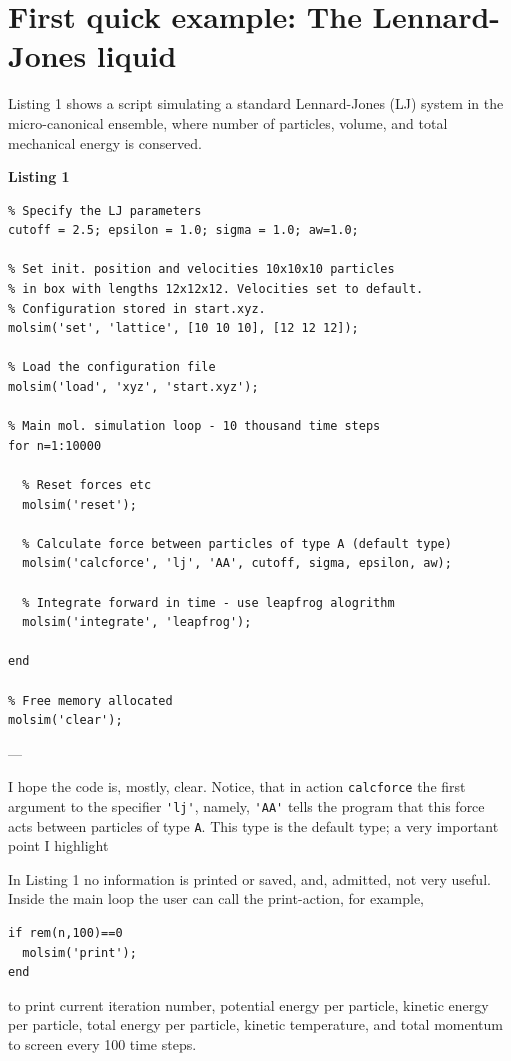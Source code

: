 \documentclass[11pt]{article}
\begin{document}
\section{First quick example: The Lennard-Jones liquid}
Listing 1 shows a script simulating a standard Lennard-Jones (LJ) system in the
micro-canonical ensemble, where number of particles, volume, and total
mechanical energy is conserved.

\bigskip

\noindent \textbf{Listing 1}
\begin{verbatim}
% Specify the LJ parameters
cutoff = 2.5; epsilon = 1.0; sigma = 1.0; aw=1.0;

% Set init. position and velocities 10x10x10 particles 
% in box with lengths 12x12x12. Velocities set to default. 
% Configuration stored in start.xyz. 
molsim('set', 'lattice', [10 10 10], [12 12 12]);

% Load the configuration file
molsim('load', 'xyz', 'start.xyz');

% Main mol. simulation loop - 10 thousand time steps
for n=1:10000

  % Reset forces etc
  molsim('reset');

  % Calculate force between particles of type A (default type)
  molsim('calcforce', 'lj', 'AA', cutoff, sigma, epsilon, aw);

  % Integrate forward in time - use leapfrog alogrithm
  molsim('integrate', 'leapfrog');
 
end

% Free memory allocated
molsim('clear');
\end{verbatim}
---

\bigskip

\noindent I hope the code is, mostly, clear. Notice, that in action \verb!calcforce! the 
first argument to the specifier \verb!'lj'!, namely, \verb!'AA'! tells the program that this 
force acts between particles of type \verb!A!. This type is the default type; a very important point I highlight
\begin{center}
\end{center}


\noindent In Listing 1 no information is printed or saved, and, admitted, not very
useful. Inside the main loop the user can call the \textsf{print}-action, for
example, 
\begin{verbatim}
if rem(n,100)==0
  molsim('print');
end
\end{verbatim}
to print current iteration number, potential energy per particle, kinetic energy
per particle, total energy per particle, kinetic temperature, and total momentum
to screen every 100 time steps.
\end{document}
